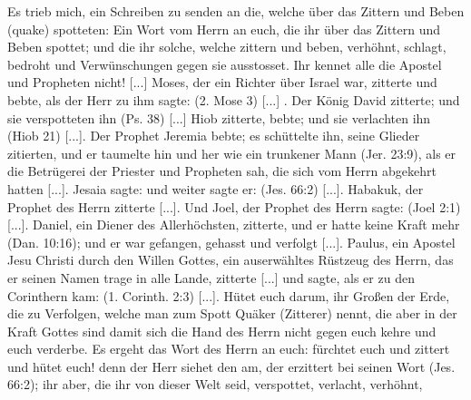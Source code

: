 Es trieb mich, ein Schreiben zu senden an die, welche über
das Zittern und Beben (quake) spotteten:
{
    Ein Wort vom Herrn an euch, die ihr über das Zittern
    und Beben spottet; und die ihr solche, welche zittern und beben,
    verhöhnt, schlagt, bedroht und Verwünschungen gegen sie 
    ausstosset. Ihr kennet alle die Apostel und Propheten nicht! [...]
    Moses, der ein Richter über Israel war, zitterte und bebte,
    als der Herr zu ihm sagte:  (2. Mose 3) [...] . Der König David zitterte;
    und sie verspotteten ihn (Ps. 38) [...] 
    Hiob zitterte, bebte;
    und sie verlachten ihn (Hiob 21) [...]. 
    Der Prophet Jeremia
    bebte; es schüttelte ihn, seine Glieder zitierten, und er taumelte
    hin und her wie ein trunkener Mann 
    (Jer. 23:9), als er die
    Betrügerei der Priester und Propheten sah, die sich vom Herrn
    abgekehrt hatten [...]. Jesaia sagte:  und weiter sagte er:
    (Jes. 66:2) [...]. Habakuk, der
    Prophet des Herrn zitterte [...]. Und Joel, der Prophet des
    Herrn sagte:  (Joel 2:1) 
    [...]. Daniel, ein Diener des
    Allerhöchsten, zitterte, und er hatte keine Kraft mehr 
    (Dan. 10:16);
    und er war gefangen, gehasst und verfolgt [...].
    Paulus, ein Apostel Jesu Christi durch den Willen Gottes, ein
    auserwähltes Rüstzeug des Herrn, das er seinen Namen trage in
    alle Lande, zitterte [...] und sagte, als er zu den Corinthern
    kam:  (1. Corinth. 
    2:3) [...].
    Hütet euch darum, ihr Großen der Erde, die zu Verfolgen,
    welche man zum Spott Quäker (Zitterer) nennt, die aber in der
    Kraft Gottes sind damit sich die Hand des Herrn nicht gegen
    euch kehre und euch verderbe. Es ergeht das Wort des Herrn
    an euch: fürchtet euch und zittert und hütet euch! denn der Herr
    siehet den am, der erzittert bei seinen Wort 
    (Jes. 66:2); ihr aber,
    die ihr von dieser Welt seid, verspottet, verlacht, verhöhnt, 
}

